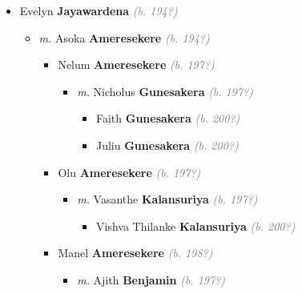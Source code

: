 \documentclass[10pt, openany]{book}
\begin{document}
\begin{itemize}
{\begin{itemize}
{\begin{itemize}
{\begin{itemize}
{\begin{itemize}
{\begin{itemize}
{\begin{itemize}
{\begin{itemize}
{\begin{itemize}
\item{Asanka  \textbf{Jayewardene} \textcolor{gray}{\textit{(b. 200?)}}
 }
\end{itemize}}
\end{itemize}
 }
\end{itemize}}
\end{itemize}
 }
\item{Evelyn \textbf{Jayawardena} \textcolor{gray}{\textit{(b. 194?)}}
\begin{itemize}
\item{\textit{m.} Asoka \textbf{Ameresekere} \textcolor{gray}{\textit{(b. 194?)}}   \label{couple:00003109:00003110} \begin{itemize}
\item{Nelum  \textbf{Ameresekere} \textcolor{gray}{\textit{(b. 197?)}}
\begin{itemize}
\item{\textit{m.} Nicholus \textbf{Gunesakera} \textcolor{gray}{\textit{(b. 197?)}}   \label{couple:00003111:00003112} \begin{itemize}
\item{Faith  \textbf{Gunesakera} \textcolor{gray}{\textit{(b. 200?)}}
 }
\item{Juliu  \textbf{Gunesakera} \textcolor{gray}{\textit{(b. 200?)}}
 }
\end{itemize}}
\end{itemize}
 }
\item{Olu \textbf{Ameresekere} \textcolor{gray}{\textit{(b. 197?)}}
\begin{itemize}
\item{\textit{m.} Vasanthe \textbf{Kalansuriya} \textcolor{gray}{\textit{(b. 197?)}}   \label{couple:00003115:00003116} \begin{itemize}
\item{Vishva Thilanke \textbf{Kalansuriya} \textcolor{gray}{\textit{(b. 200?)}}
  }
\end{itemize}}
\end{itemize}
 }
\item{Manel \textbf{Ameresekere} \textcolor{gray}{\textit{(b. 198?)}}
\begin{itemize}
\item{\textit{m.} Ajith \textbf{Benjamin} \textcolor{gray}{\textit{(b. 197?)}}   \label{couple:00003118:00003119} \begin{itemize}

\end{itemize}}
\end{itemize}}
\end{itemize}}
\end{itemize}}
\end{itemize}}
\end{itemize}}
\end{itemize}}
\end{itemize}}
\end{itemize}
\end{document}
